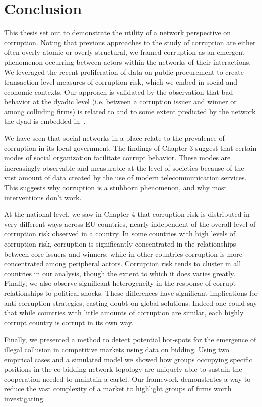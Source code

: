 \chapter{Conclusion}

This thesis set out to demonstrate the utility of a network perspective on corruption. Noting that previous approaches to the study of corruption are either often overly atomic or overly structural, we framed corruption as an emergent phenomenon occurring between actors within the networks of their interactions. We leveraged the recent proliferation of data on public procurement to create transaction-level measures of corruption risk, which we embed in social and economic contexts. Our approach is validated by the observation that bad behavior at the dyadic level (i.e. between a corruption issuer and winner or among colluding firms) is related to and to some extent predicted by the network the dyad is embedded in~\cite{granovetter1985economic}.

We have seen that social networks in a place relate to the prevalence of corruption in its local government. The findings of Chapter 3 suggest that certain modes of social organization facilitate corrupt behavior. These modes are increasingly observable and measurable at the level of societies because of the vast amount of data created by the use of modern telecommunication services. This suggests why corruption is a stubborn phenomenon, and why most interventions don't work.

At the national level, we saw in Chapter 4 that corruption risk is distributed in very different ways across EU countries, nearly independent of the overall level of corruption risk observed in a country. In some countries with high levels of corruption risk, corruption is significantly concentrated in the relationships between core issuers and winners, while in other countries corruption is more concentrated among peripheral actors. Corruption risk tends to cluster in all countries in our analysis, though the extent to which it does varies greatly. Finally, we also observe significant heterogeneity in the response of corrupt relationships to political shocks. These differences have significant implications for anti-corruption strategies, casting doubt on global solutions. Indeed one could say that while countries with little amounts of corruption are similar, each highly corrupt country is corrupt in its own way.

Finally, we presented a method to detect potential hot-spots for the emergence of illegal collusion in competitive markets using data on bidding. Using two empirical cases and a simulated model we showed how groups occupying specific positions in the co-bidding network topology are uniquely able to sustain the cooperation needed to maintain a cartel. Our framework demonstrates a way to reduce the vast complexity of a market to highlight groups of firms worth investigating.  

